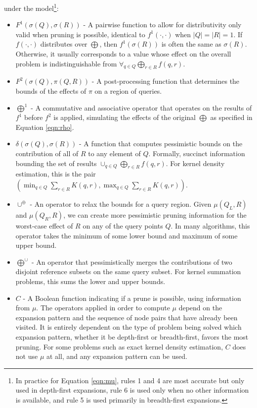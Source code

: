 \documentclass[times, 10pt,twocolumn]{article}
\newcommand{\union}{\cup}
\newcommand{\muv}{\union^{\oplus}}
\newcommand{\bigmuh}{\bigoplus^{\union}}
\begin{document}
under the model\footnote{In practice for Equation \ref{eqn:mu}, rules 1 and 4 are most accurate but only used in depth-first expansions, rule 6 is used only when no other information is available, and rule 5 is used primarily in breadth-first expansions.}:
\begin{itemize}
  \item $F^1(\sigma(Q), \sigma(R))$ - A pairwise function to allow for distributivity only valid when pruning is possible, identical to $f^1(\cdot, \cdot)$ when $|Q| = |R| = 1$.
  If $f(\cdot, \cdot)$ distributes over $\bigoplus$, then $f^1(\sigma(R))$ is often the same as $\sigma(R)$.
  Otherwise, it usually corresponds to a value whose effect on the overall problem is indistinguishable from $\forall_{q \in Q} \bigoplus_{r \in R} f(q, r)$.
  \item $F^2(\sigma(Q), \pi(Q, R))$ - A post-processing function that determines the bounds of the effects of $\pi$ on a region of queries.
  \item $\bigoplus^{1}$ - A commutative and associative operator that operates on the results of $f^1$ before $f^2$ is applied, simulating the effects of the original $\bigoplus$ as specified in Equation \ref{eqn:rho}.
  \item $\delta(\sigma(Q), \sigma(R))$ - A function that computes pessimistic bounds on the contribution of all of $R$ to any element of $Q$.
  Formally, succinct information bounding the set of results $\union_{q \in Q} \bigoplus_{r \in R} f(q, r)$.
  For kernel density estimation, this is the pair $(\min_{q \in Q} \sum_{r \in R} K(q, r), \max_{q \in Q} \sum_{r \in R} K(q, r))$.
  \item $\muv$ - An operator to relax the bounds for a query region.
  Given $\mu(Q_L, R)$ and $\mu(Q_R, R)$, we can create more pessimistic pruning information for the worst-case effect of $R$ on any of the query points $Q$.
  In many algorithms, this operator takes the minimum of some lower bound and maximum of some upper bound.
  \item $\bigmuh$ - An operator that pessimistically merges the contributions of two disjoint reference subsets on the same query subset.
  For kernel summation problems, this sums the lower and upper bounds.
  \item $C$ - A Boolean function indicating if a prune is possible, using information from $\mu$.
  The operators applied in order to compute $\mu$ depend on the expansion pattern and the sequence of node pairs that have already been visited.
  It is entirely dependent on the type of problem being solved which expansion pattern, whether it be depth-first or breadth-first, favors the most pruning.
 For some problems such as exact kernel density estimation, $C$ does not use $\mu$ at all, and any expansion pattern can be used.
\end{itemize}
\end{document}
